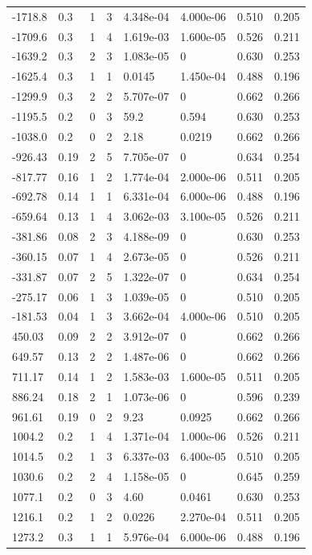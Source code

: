 \documentclass[preview]{standalone}
\begin{document}
{{\begin{tabular}{L{1.2cm}C{1.2cm} C{0.3cm}C{0.5cm} C{1.4cm}C{1.4cm} C{1.4cm}C{1.4cm}}
  -1718.8  &   0.3  & 1     &  3 &  4.348e-04  & 4.000e-06  & 0.510 &  0.205   \\ 
  -1709.6  &   0.3  & 1     &  4 &  1.619e-03  & 1.600e-05  & 0.526 &  0.211   \\ 
  -1639.2  &   0.3  & 2     &  3 &  1.083e-05  & 0  & 0.630 &  0.253   \\ 
  -1625.4  &   0.3  & 1     &  1 &  0.0145  & 1.450e-04  & 0.488 &  0.196   \\ 
  -1299.9  &   0.3  & 2     &  2 &  5.707e-07  & 0  & 0.662 &  0.266   \\ 
  -1195.5  &   0.2  & 0     &  3 &  59.2  & 0.594  & 0.630 &  0.253   \\ 
  -1038.0  &   0.2  & 0     &  2 &  2.18  & 0.0219  & 0.662 &  0.266   \\ 
  -926.43  &  0.19  & 2     &  5 &  7.705e-07  & 0  & 0.634 &  0.254   \\ 
  -817.77  &  0.16  & 1     &  2 &  1.774e-04  & 2.000e-06  & 0.511 &  0.205   \\ 
  -692.78  &  0.14  & 1     &  1 &  6.331e-04  & 6.000e-06  & 0.488 &  0.196   \\ 
  -659.64  &  0.13  & 1     &  4 &  3.062e-03  & 3.100e-05  & 0.526 &  0.211   \\ 
  -381.86  &  0.08  & 2     &  3 &  4.188e-09  & 0  & 0.630 &  0.253   \\ 
  -360.15  &  0.07  & 1     &  4 &  2.673e-05  & 0  & 0.526 &  0.211   \\ 
  -331.87  &  0.07  & 2     &  5 &  1.322e-07  & 0  & 0.634 &  0.254   \\ 
  -275.17  &  0.06  & 1     &  3 &  1.039e-05  & 0  & 0.510 &  0.205   \\ 
  -181.53  &  0.04  & 1     &  3 &  3.662e-04  & 4.000e-06  & 0.510 &  0.205   \\ 
  450.03  &  0.09  & 2     &  2 &  3.912e-07  & 0  & 0.662 &  0.266   \\ 
  649.57  &  0.13  & 2     &  2 &  1.487e-06  & 0  & 0.662 &  0.266   \\ 
  711.17  &  0.14  & 1     &  2 &  1.583e-03  & 1.600e-05  & 0.511 &  0.205   \\ 
  886.24  &  0.18  & 2     &  1 &  1.073e-06  & 0  & 0.596 &  0.239   \\ 
  961.61  &  0.19  & 0     &  2 &  9.23  & 0.0925  & 0.662 &  0.266   \\ 
  1004.2  &   0.2  & 1     &  4 &  1.371e-04  & 1.000e-06  & 0.526 &  0.211   \\ 
  1014.5  &   0.2  & 1     &  3 &  6.337e-03  & 6.400e-05  & 0.510 &  0.205   \\ 
  1030.6  &   0.2  & 2     &  4 &  1.158e-05  & 0  & 0.645 &  0.259   \\ 
  1077.1  &   0.2  & 0     &  3 &  4.60  & 0.0461  & 0.630 &  0.253   \\ 
  1216.1  &   0.2  & 1     &  2 &  0.0226  & 2.270e-04  & 0.511 &  0.205   \\ 
  1273.2  &   0.3  & 1     &  1 &  5.976e-04  & 6.000e-06  & 0.488 &  0.196   \\ 
\hline 
\end{tabular} 

}}
\end{document}
